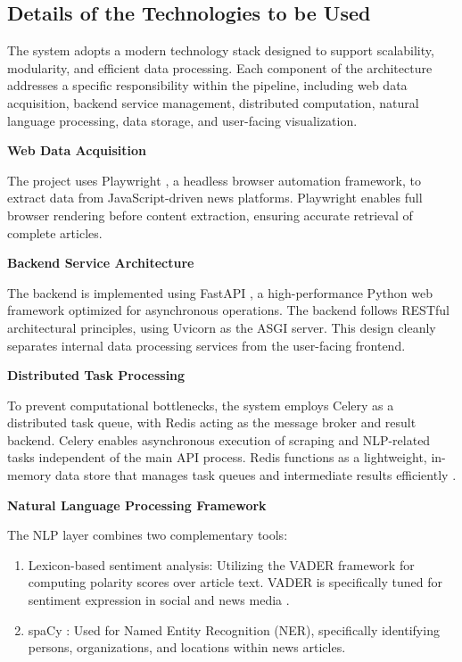 \subsection{Details of the Technologies to be Used}
\label{details-of-the-technologies-to-be-used}

The system adopts a modern technology stack designed to support scalability, modularity, and efficient data processing. Each component of the architecture addresses a specific responsibility within the pipeline, including web data acquisition, backend service management, distributed computation, natural language processing, data storage, and user-facing visualization.

\textbf{Web Data Acquisition}

The project uses Playwright \cite{ref30}, a headless browser automation framework, to extract data from JavaScript-driven news platforms. Playwright enables full browser rendering before content extraction, ensuring accurate retrieval of complete articles.

\textbf{Backend Service Architecture}

The backend is implemented using FastAPI \cite{ref27}, a high-performance Python web framework optimized for asynchronous operations. The backend follows RESTful architectural principles, using Uvicorn \cite{ref28} as the ASGI server. This design cleanly separates internal data processing services from the user-facing frontend.

\textbf{Distributed Task Processing}

To prevent computational bottlenecks, the system employs Celery \cite{ref29} as a distributed task queue, with Redis \cite{ref15} acting as the message broker and result backend. Celery enables asynchronous execution of scraping and NLP-related tasks independent of the main API process. Redis functions as a lightweight, in-memory data store that manages task queues and intermediate results efficiently \cite{ref15}.

\textbf{Natural Language Processing Framework}

The NLP layer combines two complementary tools:

\begin{enumerate}
\def\labelenumi{\arabic{enumi}.}
\item
  Lexicon-based sentiment analysis: Utilizing the VADER framework \cite{ref08} for computing polarity scores over article text. VADER is specifically tuned for sentiment expression in social and news media \cite{ref08}.
\item
  spaCy \cite{ref26}: Used for Named Entity Recognition (NER), specifically identifying persons, organizations, and locations within news articles.
\end{enumerate}

